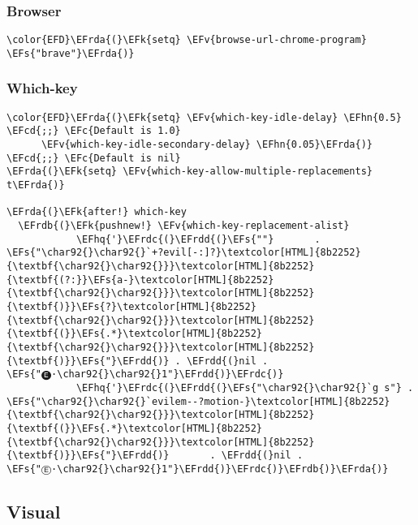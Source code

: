 \documentclass[12pt]{article}
\theoremstyle{plain}%
\theoremstyle{definition}
\theoremstyle{remark}
\newcommand{\EFc}[1]{\textcolor{EFc}{#1}} %
\newcommand{\EFcd}[1]{\textcolor{EFcd}{#1}} %
\newcommand{\EFs}[1]{\textcolor{EFs}{#1}} %
\newcommand{\EFk}[1]{\textcolor{EFk}{#1}} %
\newcommand{\EFv}[1]{\textcolor{EFv}{#1}} %
\newcommand{\EFhn}[1]{\textcolor{EFhn}{\textbf{#1}}} %
\newcommand{\EFhq}[1]{\textcolor{EFhq}{#1}} %
\newcommand{\EFrda}[1]{\textcolor{EFrda}{#1}} %
\newcommand{\EFrdb}[1]{\textcolor{EFrdb}{#1}} %
\newcommand{\EFrdc}[1]{\textcolor{EFrdc}{#1}} %
\newcommand{\EFrdd}[1]{\textcolor{EFrdd}{#1}} %
\begin{document}
\subsubsection{Browser}
\label{sec:org0564f2a}
\begin{Code}
\begin{Verbatim}
\color{EFD}\EFrda{(}\EFk{setq} \EFv{browse-url-chrome-program} \EFs{"brave"}\EFrda{)}
\end{Verbatim}
\end{Code}
\subsubsection{Which-key}
\label{sec:org854bc79}
\begin{Code}
\begin{Verbatim}
\color{EFD}\EFrda{(}\EFk{setq} \EFv{which-key-idle-delay} \EFhn{0.5} \EFcd{;;} \EFc{Default is 1.0}
      \EFv{which-key-idle-secondary-delay} \EFhn{0.05}\EFrda{)} \EFcd{;;} \EFc{Default is nil}
\EFrda{(}\EFk{setq} \EFv{which-key-allow-multiple-replacements} t\EFrda{)}

\EFrda{(}\EFk{after!} which-key
  \EFrdb{(}\EFk{pushnew!} \EFv{which-key-replacement-alist}
            \EFhq{'}\EFrdc{(}\EFrdd{(}\EFs{""}       . \EFs{"\char92{}\char92{}`+?evil[-:]?}\textcolor[HTML]{8b2252}{\textbf{\char92{}\char92{}}}\textcolor[HTML]{8b2252}{\textbf{(?:}}\EFs{a-}\textcolor[HTML]{8b2252}{\textbf{\char92{}\char92{}}}\textcolor[HTML]{8b2252}{\textbf{)}}\EFs{?}\textcolor[HTML]{8b2252}{\textbf{\char92{}\char92{}}}\textcolor[HTML]{8b2252}{\textbf{(}}\EFs{.*}\textcolor[HTML]{8b2252}{\textbf{\char92{}\char92{}}}\textcolor[HTML]{8b2252}{\textbf{)}}\EFs{"}\EFrdd{)} . \EFrdd{(}nil . \EFs{"🅔·\char92{}\char92{}1"}\EFrdd{)}\EFrdc{)}
            \EFhq{'}\EFrdc{(}\EFrdd{(}\EFs{"\char92{}\char92{}`g s"} . \EFs{"\char92{}\char92{}`evilem--?motion-}\textcolor[HTML]{8b2252}{\textbf{\char92{}\char92{}}}\textcolor[HTML]{8b2252}{\textbf{(}}\EFs{.*}\textcolor[HTML]{8b2252}{\textbf{\char92{}\char92{}}}\textcolor[HTML]{8b2252}{\textbf{)}}\EFs{"}\EFrdd{)}       . \EFrdd{(}nil . \EFs{"Ⓔ·\char92{}\char92{}1"}\EFrdd{)}\EFrdc{)}\EFrdb{)}\EFrda{)}
\end{Verbatim}
\end{Code}
\subsection{Visual}
\label{sec:orgabaa753}
\end{document}
